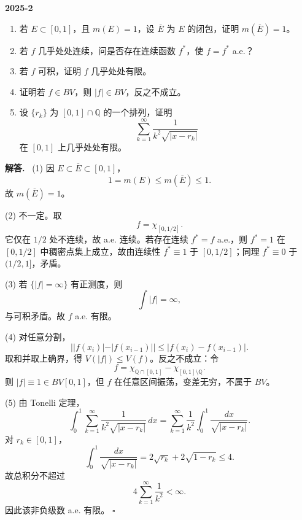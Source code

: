 \documentclass[UTF8]{ctexart}
\newcommand{\Q}{\mathbb Q}
\newenvironment{problem}[1]{\par\medskip\noindent\textbf{#1}\par\smallskip}{\par}
\newenvironment{solution}{\par\noindent\textbf{解答.}\ }{\hfill$\square$\par\medskip}
\begin{document}
\begin{problem}{2025-2}
\begin{enumerate}[label=(\arabic*)]
  \item 若 \(E\subset[0,1]\)，且 \(m(E)=1\)，设 \(\overline E\) 为 \(E\) 的闭包，证明
  \(m(\overline E)=1\)。
  \item 若 \(f\) 几乎处处连续，问是否存在连续函数 \(f^*\)，使 \(f=f^*\) a.e.？
  \item 若 \(f\) 可积，证明 \(f\) 几乎处处有限。
  \item 证明若 \(f\in BV\)，则 \(|f|\in BV\)，反之不成立。
  \item 设 \(\{r_k\}\) 为 \([0,1]\cap\Q\) 的一个排列，证明
  \[
    \sum_{k=1}^\infty \frac1{k^2\sqrt{|x-r_k|}}
  \]
  在 \([0,1]\) 上几乎处处有限。
\end{enumerate}
\end{problem}
\begin{solution}
(1) 因 \(E\subset\overline E\subset[0,1]\)，
\[
  1=m(E)\le m(\overline E)\le1.
\]
故 \(m(\overline E)=1\)。

(2) 不一定。取
\[
  f=\chi_{[0,1/2]}.
\]
它仅在 \(1/2\) 处不连续，故 a.e. 连续。若存在连续 \(f^*=f\) a.e.，则 \(f^*=1\) 在
\([0,1/2]\) 中稠密点集上成立，故由连续性 \(f^*\equiv1\) 于 \([0,1/2]\)；同理
\(f^*\equiv0\) 于 \((1/2,1]\)，矛盾。

(3) 若 \(\{|f|=\infty\}\) 有正测度，则
\[
  \int |f|=\infty,
\]
与可积矛盾。故 \(f\) a.e. 有限。

(4) 对任意分割，
\[
  ||f(x_i)|-|f(x_{i-1})||\le |f(x_i)-f(x_{i-1})|.
\]
取和并取上确界，得 \(V(|f|)\le V(f)\)。反之不成立：令
\[
  f=\chi_{\Q\cap[0,1]}-\chi_{[0,1]\setminus\Q}.
\]
则 \(|f|\equiv1\in BV[0,1]\)，但 \(f\) 在任意区间振荡，变差无穷，不属于 \(BV\)。

(5) 由 Tonelli 定理，
\[
  \int_0^1\sum_{k=1}^\infty \frac1{k^2\sqrt{|x-r_k|}}\,dx
  =\sum_{k=1}^\infty\frac1{k^2}\int_0^1\frac{dx}{\sqrt{|x-r_k|}}.
\]
对 \(r_k\in[0,1]\)，
\[
  \int_0^1\frac{dx}{\sqrt{|x-r_k|}}
  =2\sqrt{r_k}+2\sqrt{1-r_k}\le4.
\]
故总积分不超过
\[
  4\sum_{k=1}^\infty\frac1{k^2}<\infty.
\]
因此该非负级数 a.e. 有限。
\end{solution}
\end{document}
